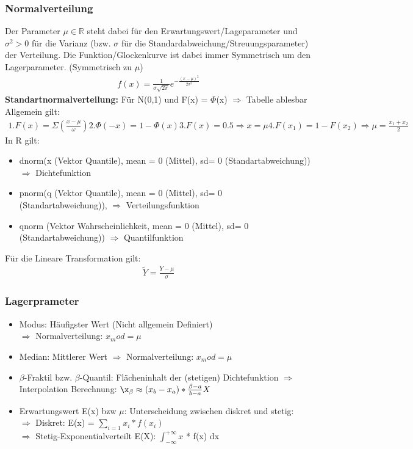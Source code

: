 \documentclass[a4paper,10pt]{scrartcl}
\begin{document}
\subsubsection{Normalverteilung}
Der Parameter $\mu\in\mathbb{R}$ steht dabei für den Erwartungswert/Lageparameter und $\sigma^2>0$ für die Varianz (bzw. $\sigma$ für die Standardabweichung/Streuungsparameter) der Verteilung. Die Funktion/Glockenkurve ist dabei immer Symmetrisch um den Lagerparameter. (Symmetrisch zu $\mu$)
\begin{align*}
f(x)=\frac{1}{\sigma\sqrt{2\pi}}e^{-\frac{(x-\mu)^2}{2\sigma^2}}
\end{align*}
\textbf{Standartnormalverteilung:}
Für N(0,1) und F(x) = $\Phi$(x) $\Rightarrow$ Tabelle ablesbar\\
Allgemein gilt:
\begin{eqnarray}
1. F(x) = \Sigma(\frac{x-\mu}{\omega})
2. \Phi(-x) = 1-\Phi(x)
3. F(x) = 0.5 \Rightarrow x = \mu
4. F(x_1) = 1 - F(x_2) \Rightarrow \mu = \frac{x_1+x_2}{2}
\end{eqnarray}
In R gilt:
\begin{itemize}
    \item dnorm(x (Vektor Quantile), mean = 0 (Mittel), sd= 0 (Standartabweichung))
    $\Rightarrow$ Dichtefunktion
    \item pnorm(q (Vektor Quantile), mean = 0 (Mittel), sd= 0 (Standartabweichung)), 
    $\Rightarrow$ Verteilungsfunktion
    \item qnorm (Vektor Wahrscheinlichkeit, mean = 0 (Mittel), sd= 0 (Standartabweichung))
    $\Rightarrow$ Quantilfunktion
\end{itemize}
Für die Lineare Transformation gilt:
\begin{eqnarray}
\tilde{Y} = \frac{Y - \mu}{\sigma}
\end{eqnarray}
\subsubsection{Lagerprameter}
\begin{itemize}
    \item Modus: Häufigster Wert (Nicht allgemein Definiert)\\
    $\Rightarrow$ Normalverteilung: $x_mod = \mu$
    \item Median: Mittlerer Wert
    $\Rightarrow$ Normalverteilung: $x_mod = \mu$ 
    \item $\beta$-Fraktil bzw. $\beta$-Quantil: Flächeninhalt der (stetigen) Dichtefunktion
    $\Rightarrow$ Interpolation Berechnung: $\x_\beta \approx (x_b - x_a)*\frac{\beta - a}{b-a} X$
    \item Erwartungswert E(x) bzw $\mu$: Unterscheidung zwischen diskret und stetig:\\
    $\Rightarrow$ Diskret: E(x) = $\sum_{i=1}^{} x_i * f(x_i)$\\
    $\Rightarrow$ Stetig-Exponentialverteilt E(X): $\int _{-\infty }^{+\infty }x$ * f(x) dx
\end{itemize}
\end{document}

